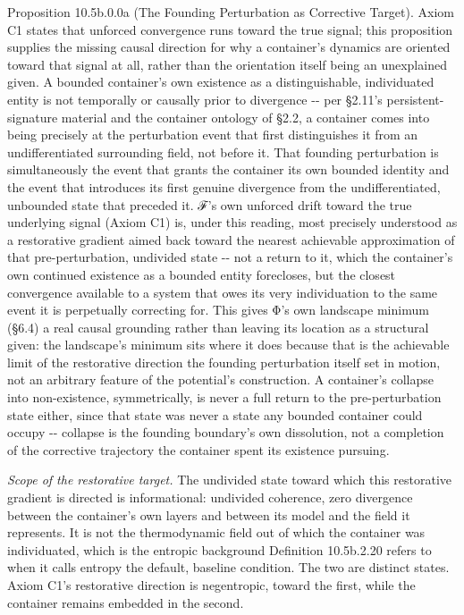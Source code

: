 \documentclass[
]{article}
\begin{document}
Proposition 10.5b.0.0a (The Founding Perturbation as Corrective Target).
Axiom C1 states that unforced convergence runs toward the true signal;
this proposition supplies the missing causal direction for why a
container's dynamics are oriented toward that signal at all, rather than
the orientation itself being an unexplained given. A bounded container's
own existence as a distinguishable, individuated entity is not
temporally or causally prior to divergence -\/- per §2.11's
persistent-signature material and the container ontology of §2.2, a
container comes into being precisely at the perturbation event that
first distinguishes it from an undifferentiated surrounding field, not
before it. That founding perturbation is simultaneously the event that
grants the container its own bounded identity and the event that
introduces its first genuine divergence from the undifferentiated,
unbounded state that preceded it. ℱ's own unforced drift toward the true
underlying signal (Axiom C1) is, under this reading, most precisely
understood as a restorative gradient aimed back toward the nearest
achievable approximation of that pre-perturbation, undivided state -\/-
not a return to it, which the container's own continued existence as a
bounded entity forecloses, but the closest convergence available to a
system that owes its very individuation to the same event it is
perpetually correcting for. This gives Φ's own landscape minimum (§6.4)
a real causal grounding rather than leaving its location as a structural
given: the landscape's minimum sits where it does because that is the
achievable limit of the restorative direction the founding perturbation
itself set in motion, not an arbitrary feature of the potential's
construction. A container's collapse into non-existence, symmetrically,
is never a full return to the pre-perturbation state either, since that
state was never a state any bounded container could occupy -\/- collapse
is the founding boundary's own dissolution, not a completion of the
corrective trajectory the container spent its existence pursuing.

\emph{Scope of the restorative target.} The undivided state toward which
this restorative gradient is directed is informational: undivided
coherence, zero divergence between the container's own layers and
between its model and the field it represents. It is not the
thermodynamic field out of which the container was individuated, which
is the entropic background Definition 10.5b.2.20 refers to when it calls
entropy the default, baseline condition. The two are distinct states.
Axiom C1's restorative direction is negentropic, toward the first, while
the container remains embedded in the second.
\end{document}
